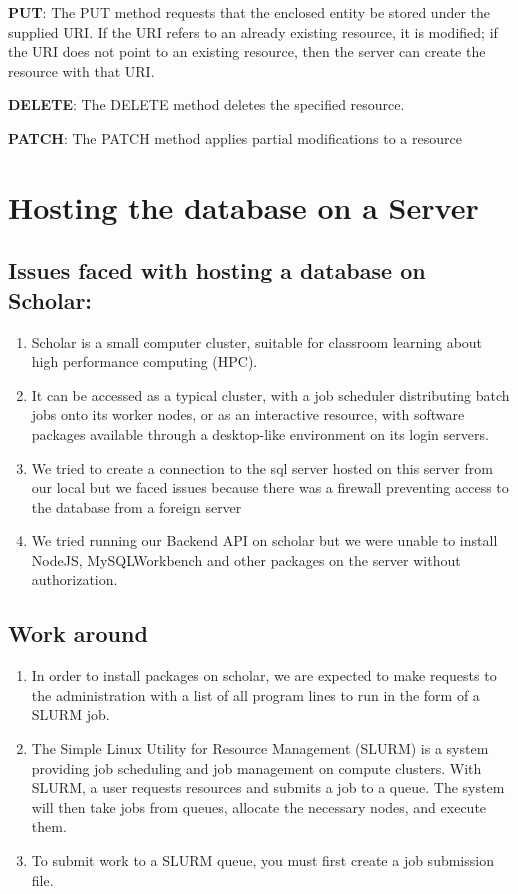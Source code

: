 \documentclass[]{book}
\providecommand{\tightlist}{%
  \setlength{\itemsep}{0pt}\setlength{\parskip}{0pt}}
\begin{document}
\textbf{PUT}: The PUT method requests that the enclosed entity be stored
under the supplied URI. If the URI refers to an already existing
resource, it is modified; if the URI does not point to an existing
resource, then the server can create the resource with that URI.

\textbf{DELETE}: The DELETE method deletes the specified resource.

\textbf{PATCH}: The PATCH method applies partial modifications to a
resource

\section{Hosting the database on a
Server}\label{hosting-the-database-on-a-server}

\subsection{Issues faced with hosting a database on
Scholar:}\label{issues-faced-with-hosting-a-database-on-scholar}

\begin{enumerate}
\def\labelenumi{\arabic{enumi}.}
\tightlist
\item
  Scholar is a small computer cluster, suitable for classroom learning
  about high performance computing (HPC).
\item
  It can be accessed as a typical cluster, with a job scheduler
  distributing batch jobs onto its worker nodes, or as an interactive
  resource, with software packages available through a desktop-like
  environment on its login servers.
\item
  We tried to create a connection to the sql server hosted on this
  server from our local but we faced issues because there was a firewall
  preventing access to the database from a foreign server
\item
  We tried running our Backend API on scholar but we were unable to
  install NodeJS, MySQLWorkbench and other packages on the server
  without authorization.
\end{enumerate}

\subsection{Work around}\label{work-around}

\begin{enumerate}
\def\labelenumi{\arabic{enumi}.}
\item
  In order to install packages on scholar, we are expected to make
  requests to the administration with a list of all program lines to run
  in the form of a SLURM job.
\item
  The Simple Linux Utility for Resource Management (SLURM) is a system
  providing job scheduling and job management on compute clusters. With
  SLURM, a user requests resources and submits a job to a queue. The
  system will then take jobs from queues, allocate the necessary nodes,
  and execute them.
\item
  To submit work to a SLURM queue, you must first create a job
  submission file.
\end{enumerate}
\end{document}
